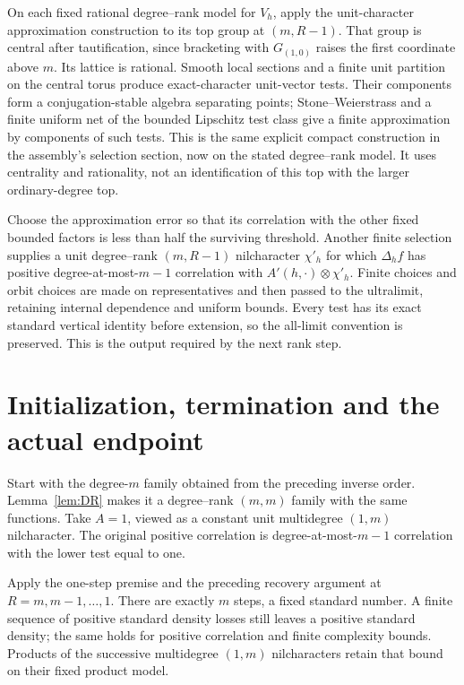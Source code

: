 \documentclass[11pt]{article}
\begin{document}
On each fixed rational degree--rank model for $V_h$, apply the
unit-character approximation construction to its top group at
$(m,R-1)$. That group is central after tautification, since bracketing
with $G_{(1,0)}$ raises the first coordinate above $m$. Its lattice
is rational. Smooth local sections and a finite unit partition on the
central torus produce exact-character unit-vector tests. Their components
form a conjugation-stable algebra separating points; Stone--Weierstrass
and a finite uniform net of the bounded Lipschitz test class give a
finite approximation by components of such tests. This is the same
explicit compact construction in the assembly's selection section,
now on the stated degree--rank model. It uses centrality and rationality,
not an identification of this top with the larger ordinary-degree top.

Choose the approximation error so that its correlation with the other
fixed bounded factors is less than half the surviving threshold.
Another finite selection supplies a unit degree--rank $(m,R-1)$
nilcharacter $\chi'_h$ for which $\Delta_h f$ has positive
degree-at-most-$m-1$ correlation with
$A'(h,\cdot)\otimes\chi'_h$. Finite choices and orbit choices are
made on representatives and then passed to the ultralimit, retaining
internal dependence and uniform bounds. Every test has its exact
standard vertical identity before extension, so the all-limit
convention is preserved. This is the output required by the next
rank step.

\section{Initialization, termination and the actual endpoint}

Start with the degree-$m$ family obtained from the preceding inverse
order. Lemma~\ref{lem:DR} makes it a degree--rank $(m,m)$ family
with the same functions. Take $A=1$, viewed as a constant unit
multidegree $(1,m)$ nilcharacter. The original positive correlation
is degree-at-most-$m-1$ correlation with the lower test equal to one.

Apply the one-step premise and the preceding recovery argument at
$R=m,m-1,\ldots,1$. There are exactly $m$ steps, a fixed standard
number. A finite sequence of positive standard density losses still
leaves a positive standard density; the same holds for positive
correlation and finite complexity bounds. Products of the successive
multidegree $(1,m)$ nilcharacters retain that bound on their fixed
product model.
\end{document}

